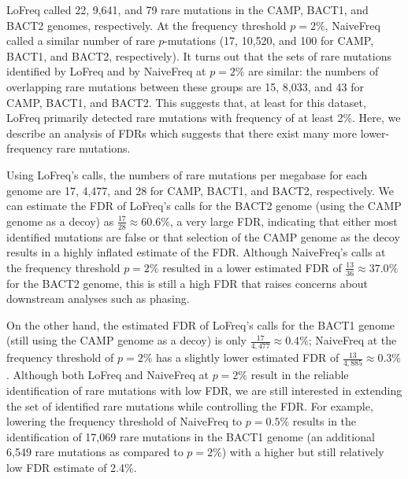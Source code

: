 LoFreq called 22, 9,641, and 79 rare mutations in the CAMP, BACT1, and BACT2 genomes, respectively. At the frequency threshold $p = 2\%$, NaiveFreq called a similar number of rare $p$-mutations (17, 10,520, and 100 for CAMP, BACT1, and BACT2, respectively). It turns out that the sets of rare mutations identified by LoFreq and by NaiveFreq at $p = 2\%$ are similar: the numbers of overlapping rare mutations between these groups are 15, 8,033, and 43 for CAMP, BACT1, and BACT2. This suggests that, at least for this dataset, LoFreq primarily detected rare mutations with frequency of at least 2\%. Here, we describe an analysis of FDRs which suggests that there exist many more lower-frequency rare mutations.

Using LoFreq's calls, the numbers of rare mutations per megabase for each genome are 17, 4,477, and 28 for CAMP, BACT1, and BACT2, respectively. We can estimate the FDR of LoFreq's calls for the BACT2 genome (using the CAMP genome as a decoy) as $\frac{17}{28} \approx 60.6\%$, a very large FDR, indicating that either most identified mutations are false or that selection of the CAMP genome as the decoy results in a highly inflated estimate of the FDR. Although NaiveFreq's calls at the frequency threshold $p = 2\%$ resulted in a lower estimated FDR of $\frac{13}{36} \approx 37.0\%$ for the BACT2 genome, this is still a high FDR that raises concerns about downstream analyses such as phasing.

On the other hand, the estimated FDR of LoFreq's calls for the BACT1 genome (still using the CAMP genome as a decoy) is only $\frac{17}{4,477} \approx 0.4\%$; NaiveFreq at the frequency threshold of $p = 2\%$ has a slightly lower estimated FDR of $\frac{13}{4,885} \approx 0.3\%$. Although both LoFreq and NaiveFreq at $p = 2\%$ result in the reliable identification of rare mutations with low FDR, we are still interested in extending the set of identified rare mutations while controlling the FDR. For example, lowering the frequency threshold of NaiveFreq to $p = 0.5\%$ results in the identification of 17,069 rare mutations in the BACT1 genome (an additional 6,549 rare mutations as compared to $p = 2\%$) with a higher but still relatively low FDR estimate of 2.4\%.\endinput